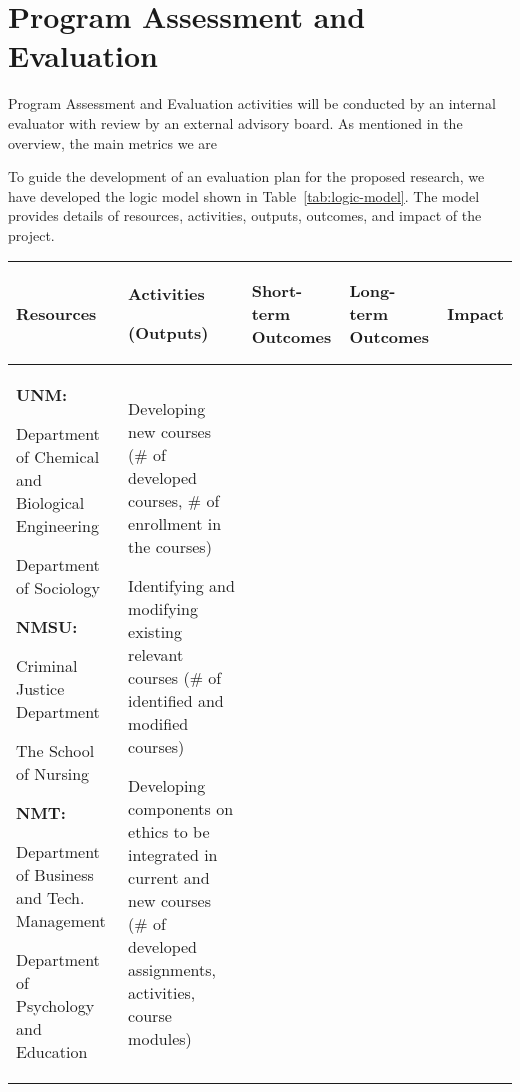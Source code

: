 \section{Program Assessment and Evaluation}
\label{sec:assessment}
Program Assessment and Evaluation activities will be conducted by an internal evaluator with review by an external advisory board. As mentioned in the overview, the main metrics we are 


To guide the development of an evaluation plan for the proposed research, we have developed the logic model shown in Table~\ref{tab:logic-model}. The model provides details of resources, activities, outputs, outcomes, and impact of the project.

\begin{table}[htb!]
\begin{tabular}{|p{1in}|p{1in}|p{1.5in}|p{1in}|p{1in}|}
    \hline
    \textbf{Resources}& \textbf{Activities}
    
   \textbf{(Outputs)} & \textbf{Short-term Outcomes} 
    & \textbf{Long-term Outcomes} &\textbf{Impact} \\
    \hline
    \textbf{UNM:}
    
    Department of Chemical and Biological Engineering
 
    \vspace{0.1in}
    Department of Sociology
    
     \vspace{0.25in}
     \textbf{NMSU:}
     
     Criminal Justice Department

     \vspace{0.1in}
     The School of Nursing
          
     \vspace{0.25in}
     \textbf{NMT:}
     
      Department of Business and Tech. Management
       
      \vspace{0.1in}
      Department of Psychology and Education 
     
    &
    Developing new courses (\# of developed courses, \# of enrollment in the courses)

    \vspace{0.1in}
    Identifying and modifying existing relevant courses (\# of identified and modified courses)

    \vspace{0.1in}
    Developing components on ethics to be integrated in current and new courses (\# of developed assignments, activities, course modules)


\end{tabular}
\end{table}
